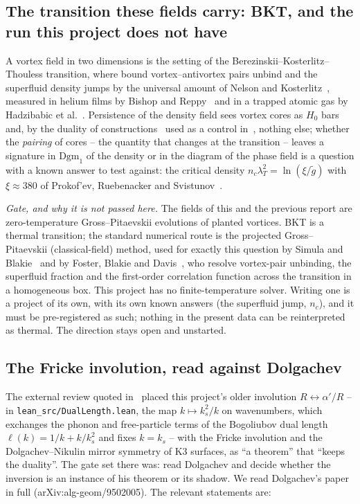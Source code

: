 \documentclass[11pt,a4paper]{article}
\newcommand{\lean}[1]{\texttt{\small #1}}
\newcommand{\Dgm}{\mathrm{Dgm}}
\begin{document}
\subsection{The transition these fields carry: BKT, and the run this project does not have}

A vortex field in two dimensions is the setting of the Berezinskii--Kosterlitz--Thouless transition,
where bound vortex--antivortex pairs unbind and the superfluid density jumps by the universal amount
of Nelson and Kosterlitz~\cite{NelsonKosterlitz1977}, measured in helium films by Bishop and
Reppy~\cite{BishopReppy1978} and in a trapped atomic gas by Hadzibabic et al.~\cite{Hadzibabic2006}.
Persistence of the density field sees vortex cores as $H_0$ bars and, by the duality of
constructions~\cite{Bleile2021} used as a control in~\cite{Callens2026TDA}, nothing else; whether the
\emph{pairing} of cores -- the quantity that changes at the transition -- leaves a signature in
$\Dgm_1$ of the density or in the diagram of the phase field is a question with a known answer to test
against: the critical density $n_c\lambda_T^2=\ln(\xi/\tilde g)$ with $\xi\approx380$ of Prokof'ev,
Ruebenacker and Svistunov~\cite{Prokofev2001}.

\emph{Gate, and why it is not passed here.} The fields of this and the previous report are
zero-temperature Gross--Pitaevskii evolutions of planted vortices. BKT is a thermal transition; the
standard numerical route is the projected Gross--Pitaevskii (classical-field) method, used for exactly
this question by Simula and Blakie~\cite{SimulaBlakie2006} and by Foster, Blakie and
Davis~\cite{FosterBlakieDavis2010}, who resolve vortex-pair unbinding, the superfluid fraction and the
first-order correlation function across the transition in a homogeneous box. This project has no
finite-temperature solver. Writing one is a project of its own, with its own known answers (the
superfluid jump, $n_c$), and it must be pre-registered as such; nothing in the present data can be
reinterpreted as thermal. The direction stays open and unstarted.

\subsection{The Fricke involution, read against Dolgachev}
\label{sec:fricke}

The external review quoted in~\cite{Callens2026Loop} placed this project's older involution
$R\leftrightarrow\alpha'/R$ -- in \lean{lean\_src/DualLength.lean}, the map $k\mapsto k_s^2/k$ on
wavenumbers, which exchanges the phonon and free-particle terms of the Bogoliubov dual length
$\ell(k)=1/k+k/k_s^2$ and fixes $k=k_s$ -- with the Fricke involution and the Dolgachev--Nikulin mirror
symmetry of K3 surfaces, as ``a theorem'' that ``keeps the duality''. The gate set there was: read
Dolgachev and decide whether the inversion is an instance of his theorem or its shadow. We read
Dolgachev's paper~\cite{Dolgachev1996} in full (arXiv:alg-geom/9502005). The relevant statements are:
\end{document}
